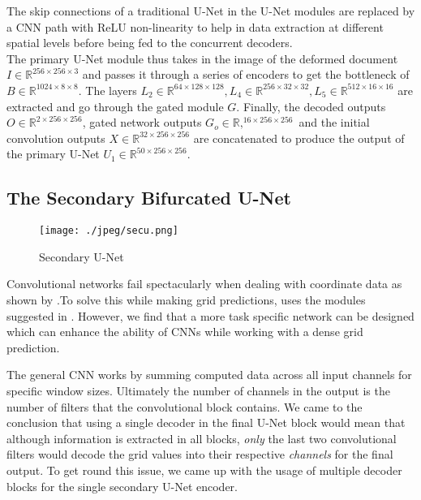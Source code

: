\documentclass[a4paper,conference]{IEEEtran}
\begin{document}
	The skip connections of a traditional	 U-Net in the U-Net modules are replaced by a CNN path with ReLU non-linearity to help in data extraction at different spatial levels before being fed to the concurrent decoders.
	\\
	
	The primary U-Net module thus takes in the image of the deformed document $I \in \mathbb{R} ^{256\times256\times3}$ and passes it through a series of encoders to get the bottleneck of $B \in \mathbb{R} ^{1024\times8\times8}$. The layers $L_{2} \in \mathbb{R} ^{64\times128\times128},L_{4}\in \mathbb{R} ^{256\times32\times32},L_{5}\in \mathbb{R} ^{512\times16\times16}$ are extracted and go through the gated module $G$. Finally, the decoded outputs $O\in \mathbb{R} ^{2\times256\times256}$, gated network outputs $G_{o}\in \mathbb{R},  ^{16\times256\times256}$ and the initial convolution outputs $X\in \mathbb{R} ^{32\times256\times256}$ are concatenated to produce the output of the primary U-Net $U_{1}\in \mathbb{R} ^{50\times256\times256}$. 
	
	\subsection{The Secondary Bifurcated U-Net}
	\begin{figure*}[!h]
		\centering
		{	
			\texttt{[image: ./jpeg/secu.png]}
		}
		\caption{Secondary U-Net}
		\label{arch4}
	\end{figure*}
	
	Convolutional networks fail spectacularly when dealing with coordinate data as shown by \cite{coordconv}.To solve this while making grid predictions, \cite{das2019dewarpnet} uses the modules suggested in \cite{coordconv}. However, we find that a more task specific network can be designed which can enhance the ability of CNNs while working with a dense grid prediction.
	
	The general CNN works by summing computed data across all input channels for specific window sizes. Ultimately the number of channels in the output is the number of filters that the convolutional block contains. We came to the conclusion that using a single decoder in the final U-Net block would mean that although 	information is extracted in all blocks, \emph{only} the last two convolutional filters would decode the grid values into their respective \emph{channels} for the final output. To get round this issue, we came up with the usage of multiple decoder blocks for the single secondary U-Net encoder. 
	\\
	
\end{document}
